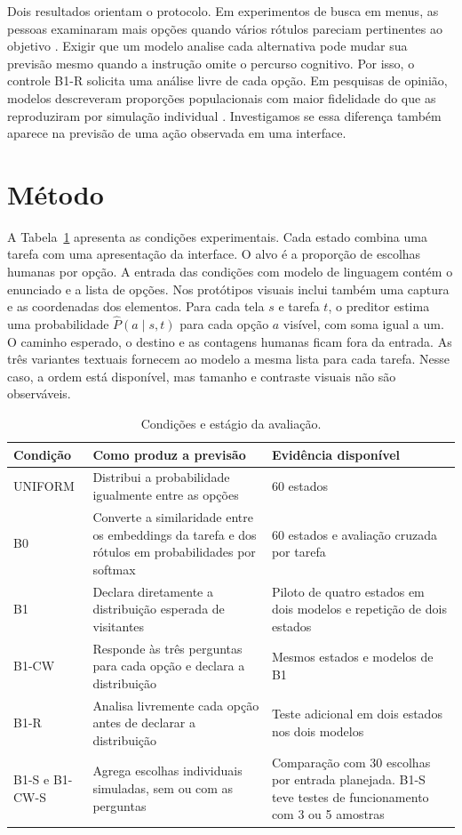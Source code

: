 \documentclass[12pt]{article}
\begin{document}
Dois resultados orientam o protocolo. Em experimentos de busca em menus, as pessoas examinaram mais opções quando vários rótulos pareciam pertinentes ao objetivo \cite{brumby2008}. Exigir que um modelo analise cada alternativa pode mudar sua previsão mesmo quando a instrução omite o percurso cognitivo. Por isso, o controle B1-R solicita uma análise livre de cada opção. Em pesquisas de opinião, modelos descreveram proporções populacionais com maior fidelidade do que as reproduziram por simulação individual \cite{meister2025}. Investigamos se essa diferença também aparece na previsão de uma ação observada em uma interface.

\section{Método}

A Tabela~\ref{tab:metodo} apresenta as condições experimentais. Cada estado combina uma tarefa com uma apresentação da interface. O alvo é a proporção de escolhas humanas por opção. A entrada das condições com modelo de linguagem contém o enunciado e a lista de opções. Nos protótipos visuais inclui também uma captura e as coordenadas dos elementos. Para cada tela $s$ e tarefa $t$, o preditor estima uma probabilidade $\hat P(a\mid s,t)$ para cada opção $a$ visível, com soma igual a um. O caminho esperado, o destino e as contagens humanas ficam fora da entrada. As três variantes textuais fornecem ao modelo a mesma lista para cada tarefa. Nesse caso, a ordem está disponível, mas tamanho e contraste visuais não são observáveis.

\begin{table}[!htb]\centering\small\caption{Condições e estágio da avaliação.}\label{tab:metodo}\begin{tabularx}{\linewidth}{@{}lXX@{}}\toprule
Condição & Como produz a previsão & Evidência disponível \\ \midrule
UNIFORM & Distribui a probabilidade igualmente entre as opções & 60 estados \\
B0 & Converte a similaridade entre os embeddings da tarefa e dos rótulos em probabilidades por softmax & 60 estados e avaliação cruzada por tarefa \\
B1 & Declara diretamente a distribuição esperada de visitantes & Piloto de quatro estados em dois modelos e repetição de dois estados \\
B1-CW & Responde às três perguntas para cada opção e declara a distribuição & Mesmos estados e modelos de B1 \\
B1-R & Analisa livremente cada opção antes de declarar a distribuição & Teste adicional em dois estados nos dois modelos \\
B1-S e B1-CW-S & Agrega escolhas individuais simuladas, sem ou com as perguntas & Comparação com 30 escolhas por entrada planejada. B1-S teve testes de funcionamento com 3 ou 5 amostras \\\bottomrule\end{tabularx}\end{table}
\end{document}
